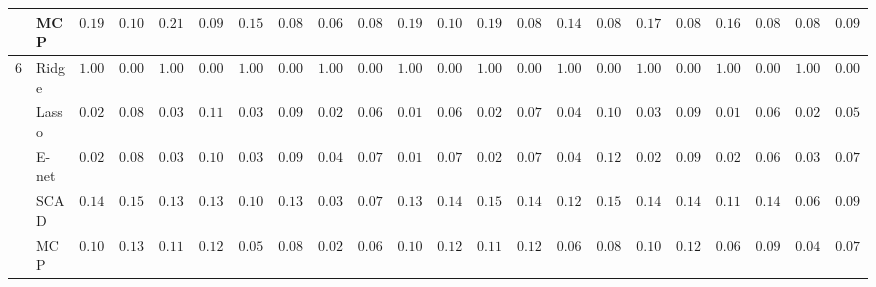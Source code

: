 \begin{tabular}{p{0.2cm}p{1cm}|p{0.6cm}p{0.6cm}|p{0.6cm}p{0.6cm}p{0.6cm}p{0.6cm}p{0.6cm}p{0.6cm}|p{0.6cm}p{0.6cm}p{0.6cm}p{0.6cm}p{0.6cm}p{0.6cm}|p{0.6cm}p{0.6cm}p{0.6cm}p{0.6cm}p{0.6cm}p{0.6cm}}
 & MCP  & $0.1917$ & $0.1069$ & $0.2117$ & $0.0973$ & $0.1567$ & $0.0881$ & $0.0633$ & $0.0847$ & $0.1917$ & $0.1043$ & $0.1933$ & $0.0811$ & $0.1483$ & $0.0883$ & $0.1783$ & $0.0829$ & $0.1683$ & $0.0870$ & $0.0883$ & $0.0931$ \\\hline
6 & Ridge  & $1.0000$ & $0.0000$ & $1.0000$ & $0.0000$ & $1.0000$ & $0.0000$ & $1.0000$ & $0.0000$ & $1.0000$ & $0.0000$ & $1.0000$ & $0.0000$ & $1.0000$ & $0.0000$ & $1.0000$ & $0.0000$ & $1.0000$ & $0.0000$ & $1.0000$ & $0.0000$ \\
 & Lasso  & $0.0250$ & $0.0833$ & $0.0333$ & $0.1111$ & $0.0350$ & $0.0956$ & $0.0267$ & $0.0614$ & $0.0150$ & $0.0631$ & $0.0267$ & $0.0739$ & $0.0417$ & $0.1069$ & $0.0300$ & $0.0959$ & $0.0183$ & $0.0622$ & $0.0233$ & $0.0581$ \\
 & E-net  & $0.0250$ & $0.0833$ & $0.0333$ & $0.1033$ & $0.0367$ & $0.0993$ & $0.0400$ & $0.0790$ & $0.0183$ & $0.0707$ & $0.0267$ & $0.0776$ & $0.0467$ & $0.1233$ & $0.0283$ & $0.0949$ & $0.0200$ & $0.0682$ & $0.0367$ & $0.0771$ \\
 & SCAD  & $0.1400$ & $0.1548$ & $0.1350$ & $0.1334$ & $0.1033$ & $0.1356$ & $0.0350$ & $0.0760$ & $0.1333$ & $0.1460$ & $0.1517$ & $0.1462$ & $0.1250$ & $0.1542$ & $0.1417$ & $0.1448$ & $0.1183$ & $0.1407$ & $0.0633$ & $0.0941$ \\
 & MCP  & $0.1017$ & $0.1338$ & $0.1100$ & $0.1258$ & $0.0567$ & $0.0893$ & $0.0267$ & $0.0658$ & $0.1017$ & $0.1229$ & $0.1133$ & $0.1205$ & $0.0617$ & $0.0875$ & $0.1050$ & $0.1200$ & $0.0617$ & $0.0937$ & $0.0483$ & $0.0796$ \\
\hline 
\end{tabular}

